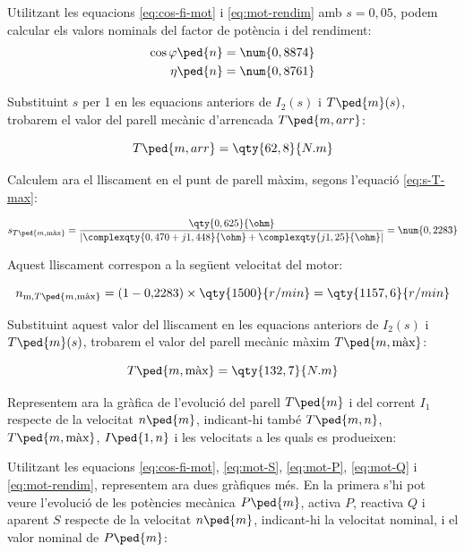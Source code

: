 \begin{exemple}
    Utilitzant les equacions  \eqref{eq:cos-fi-mot} i \eqref{eq:mot-rendim} amb $s  = 0{,}05$, podem calcular els valors nominals del factor de potència i del rendiment:
    \begin{align*}
    	\cos\varphi\ped{n} &= \num{0,8874} \\
    	\eta\ped{n} &=  \num{0,8761}
    \end{align*}
    
    Substituint $s$ per 1   en les equacions anteriors de $I_2(s)$  i $T\ped{m}(s)$, trobarem el valor del parell mecànic d'arrencada $T\ped{m,arr}$:
    
	\[
		T\ped{m,arr} = \qty{62,8}{N.m}
	\]

    Calculem ara el lliscament en el punt de parell màxim, segons l'equació \eqref{eq:s-T-max}:
    
    \[
        s_{T\ped{m,\text{màx}}} =  \frac{\qty{0,625}{\ohm}}{|\complexqty{0,470+j1,448}{\ohm} + \complexqty{j1,25}{\ohm}|} = \num{0,2283} 
    \]
    
    Aquest lliscament correspon a la següent  velocitat del motor:
    
    \[
    	n_{\text{m},T\ped{m,\text{màx}}} = (1 - 0{,}2283) \times \qty{1500}{r/min} = \qty{1157,6}{r/min}
    \]
    
  Substituint aquest valor del lliscament en les equacions anteriors de $I_2(s)$  i $T\ped{m}(s)$, trobarem el valor del parell mecànic màxim  $T\ped{m,\text{màx}}$:
  
  \[
 	T\ped{m,\text{màx}} = \qty{132,7}{N.m}
  \]


    Representem ara la gràfica de l'evolució del parell $T\ped{m}$ i del corrent $I_1$ respecte de la velocitat $n\ped{m}$, indicant-hi també $T\ped{m,n}$, $T\ped{m,\text{màx}}$, $I\ped{1,n}$ i les velocitats a les quals es produeixen:
    \begin{center}
        \fontsize{10pt}{11pt}\selectfont
        
    \end{center}
	\vspace{-2mm}
	Utilitzant les equacions \eqref{eq:cos-fi-mot}, \eqref{eq:mot-S}, \eqref{eq:mot-P}, \eqref{eq:mot-Q} i \eqref{eq:mot-rendim}, representem ara dues gràfiques més. 	  En la primera s'hi pot veure  l'evolució de les potències mecànica $P\ped{m}$, activa  $P$, reactiva $Q$ i aparent $S$ respecte de la velocitat $n\ped{m}$, indicant-hi  la   velocitat nominal, i el valor nominal de $P\ped{m}$:
	\begin{center}
		\fontsize{10pt}{11pt}\selectfont
		
	\end{center}	
	

\end{exemple}
